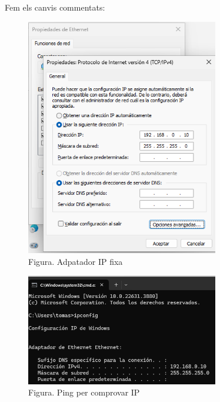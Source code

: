 \documentclass[
  a4paper,
]{article}
\begin{document}
Fem els canvis commentats:

\begin{figure}
\centering
\includegraphics[width=0.75\textwidth,height=\textheight]{png/adaptador1.png}
\caption{Figura. Adpatador IP fixa}
\end{figure}

\begin{figure}
\centering
\includegraphics[width=0.75\textwidth,height=\textheight]{png/ipconfig.png}
\caption{Figura. Ping per comprovar IP}
\end{figure}
\end{document}
